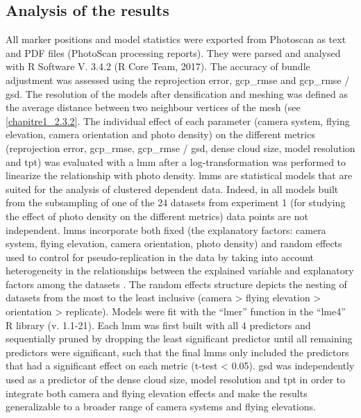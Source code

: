 \subsection{Analysis of the results}\label{chapitre1_2.4}
All marker positions and model statistics were exported from Photoscan as text and PDF files (PhotoScan processing reports). They were parsed and analysed with R Software V. 3.4.2 (R Core Team, 2017). The accuracy of bundle adjustment was assessed using the reprojection error, \acrshort{gcp_rmse} and \acrshort{gcp_rmse} / \acrshort{gsd}. The resolution of the models after densification and meshing was defined as the average distance between two neighbour vertices of the mesh (see \ref{chapitre1_2.3.2}. The individual effect of each parameter (camera system, flying elevation, camera orientation and photo density) on the different metrics (reprojection error, \acrshort{gcp_rmse}, \acrshort{gcp_rmse} / \acrshort{gsd}, dense cloud size, model resolution and \acrshort{tpt}) was evaluated with a \gls{lmm} \citep{zuur_mixed_2009} after a log-transformation was performed to linearize the relationship with photo density. \acrshort{lmm}s are statistical models that are suited for the analysis of clustered dependent data. Indeed, in all models built from the subsampling of one of the 24 datasets from experiment 1 (for studying the effect of photo density on the different metrics) data points are not independent. \acrshort{lmm}s incorporate both fixed (the explanatory factors: camera system, flying elevation, camera orientation, photo density) and random effects used to control for pseudo-replication in the data by taking into account heterogeneity in the relationships between the explained variable and explanatory factors among the datasets \citep{patino_accounting_2013}. The random effects structure depicts the nesting of datasets from the most to the least inclusive (camera > flying elevation > orientation > replicate). Models were fit with the “lmer” function in the “lme4” R library (v. 1.1-21). Each \acrshort{lmm} was first built with all 4 predictors and sequentially pruned by dropping the least significant predictor until all remaining predictors were significant, such that the final \acrshort{lmm}s only included the predictors that had a significant effect on each metric (t-test < 0.05). \acrshort{gsd} was independently used as a predictor of the dense cloud size, model resolution and \acrshort{tpt} in order to integrate both camera and flying elevation effects and make the results generalizable to a broader range of camera systems and flying elevations.

